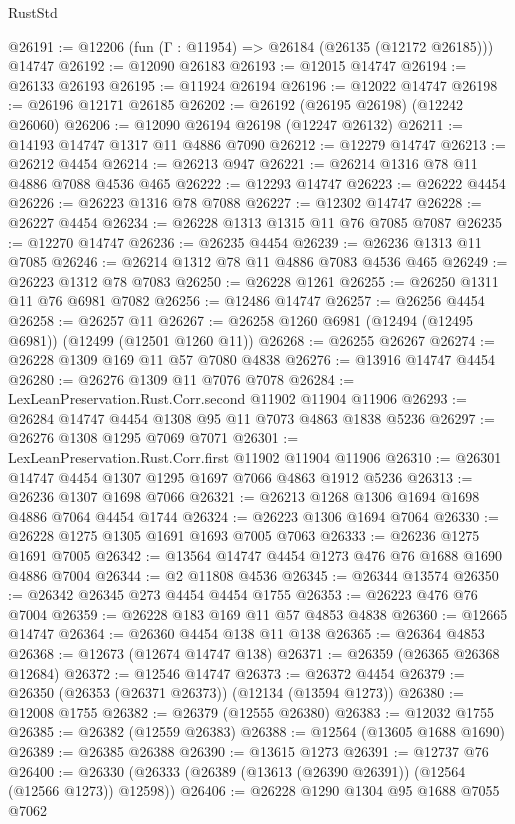 \begin{lexlean}{RustStd}
\begin{coremodule}
{\begin{coremodule}
{{{{{{{{{{{{{{{{{{{{{{{{{{{{{{{{{{{{{{{{{{{{{{{{{{{{{{{{{{{{{{{{{{{{{{{{{{{{{{{{@26191 := @12206 (fun (Γ : @11954) => @26184 (@26135 (@12172 @26185))) @14747
@26192 := @12090 @26183
@26193 := @12015 @14747
@26194 := @26133 @26193
@26195 := @11924 @26194
@26196 := @12022 @14747
@26198 := @26196 @12171 @26185
@26202 := @26192 (@26195 @26198) (@12242 @26060)
@26206 := @12090 @26194 @26198 (@12247 @26132)
@26211 := @14193 @14747 @1317 @11 @4886 @7090
@26212 := @12279 @14747
@26213 := @26212 @4454
@26214 := @26213 @947
@26221 := @26214 @1316 @78 @11 @4886 @7088 @4536 @465
@26222 := @12293 @14747
@26223 := @26222 @4454
@26226 := @26223 @1316 @78 @7088
@26227 := @12302 @14747
@26228 := @26227 @4454
@26234 := @26228 @1313 @1315 @11 @76 @7085 @7087
@26235 := @12270 @14747
@26236 := @26235 @4454
@26239 := @26236 @1313 @11 @7085
@26246 := @26214 @1312 @78 @11 @4886 @7083 @4536 @465
@26249 := @26223 @1312 @78 @7083
@26250 := @26228 @1261
@26255 := @26250 @1311 @11 @76 @6981 @7082
@26256 := @12486 @14747
@26257 := @26256 @4454
@26258 := @26257 @11
@26267 := @26258 @1260 @6981 (@12494 (@12495 @6981)) (@12499 (@12501 @1260 @11))
@26268 := @26255 @26267
@26274 := @26228 @1309 @169 @11 @57 @7080 @4838
@26276 := @13916 @14747 @4454
@26280 := @26276 @1309 @11 @7076 @7078
@26284 := LexLeanPreservation.Rust.Corr.second @11902 @11904 @11906
@26293 := @26284 @14747 @4454 @1308 @95 @11 @7073 @4863 @1838 @5236
@26297 := @26276 @1308 @1295 @7069 @7071
@26301 := LexLeanPreservation.Rust.Corr.first @11902 @11904 @11906
@26310 := @26301 @14747 @4454 @1307 @1295 @1697 @7066 @4863 @1912 @5236
@26313 := @26236 @1307 @1698 @7066
@26321 := @26213 @1268 @1306 @1694 @1698 @4886 @7064 @4454 @1744
@26324 := @26223 @1306 @1694 @7064
@26330 := @26228 @1275 @1305 @1691 @1693 @7005 @7063
@26333 := @26236 @1275 @1691 @7005
@26342 := @13564 @14747 @4454 @1273 @476 @76 @1688 @1690 @4886 @7004
@26344 := @2 @11808 @4536
@26345 := @26344 @13574
@26350 := @26342 @26345 @273 @4454 @4454 @1755
@26353 := @26223 @476 @76 @7004
@26359 := @26228 @183 @169 @11 @57 @4853 @4838
@26360 := @12665 @14747
@26364 := @26360 @4454 @138 @11 @138
@26365 := @26364 @4853
@26368 := @12673 (@12674 @14747 @138)
@26371 := @26359 (@26365 @26368 @12684)
@26372 := @12546 @14747
@26373 := @26372 @4454
@26379 := @26350 (@26353 (@26371 @26373)) (@12134 (@13594 @1273))
@26380 := @12008 @1755
@26382 := @26379 (@12555 @26380)
@26383 := @12032 @1755
@26385 := @26382 (@12559 @26383)
@26388 := @12564 (@13605 @1688 @1690)
@26389 := @26385 @26388
@26390 := @13615 @1273
@26391 := @12737 @76
@26400 := @26330 (@26333 (@26389 (@13613 (@26390 @26391)) (@12564 (@12566 @1273)) @12598))
@26406 := @26228 @1290 @1304 @95 @1688 @7055 @7062
}}}}}}}}}}}}}}}}}}}}}}}}}}}}}}}}}}}}}}}}}}}}}}}}}}}}}}}}}}}}}}}}}}}}}}}}}}}}}}}}
\end{coremodule}}
\end{coremodule}
\end{lexlean}
